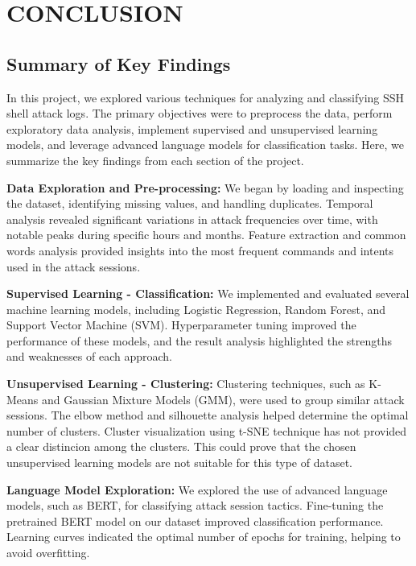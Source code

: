 

\section{CONCLUSION}


    \subsection{Summary of Key Findings}
    
        In this project, we explored various techniques for analyzing and classifying SSH shell attack logs. The primary objectives were to preprocess the data, perform exploratory data analysis, implement supervised and unsupervised learning models, and leverage advanced language models for classification tasks. Here, we summarize the key findings from each section of the project.

        \textbf{Data Exploration and Pre-processing:} We began by loading and inspecting the dataset, identifying missing values, and handling duplicates. Temporal analysis revealed significant variations in attack frequencies over time, with notable peaks during specific hours and months. Feature extraction and common words analysis provided insights into the most frequent commands and intents used in the attack sessions.

        \textbf{Supervised Learning - Classification:} We implemented and evaluated several machine learning models, including Logistic Regression, Random Forest, and Support Vector Machine (SVM). Hyperparameter tuning improved the performance of these models, and the result analysis highlighted the strengths and weaknesses of each approach.

        \textbf{Unsupervised Learning - Clustering:} Clustering techniques, such as K-Means and Gaussian Mixture Models (GMM), were used to group similar attack sessions. The elbow method and silhouette analysis helped determine the optimal number of clusters. Cluster visualization using t-SNE technique has not provided a clear distincion among the clusters. This could prove that the chosen unsupervised learning models are not suitable for this type of dataset. 

        \textbf{Language Model Exploration:} We explored the use of advanced language models, such as BERT, for classifying attack session tactics. Fine-tuning the pretrained BERT model on our dataset improved classification performance. Learning curves indicated the optimal number of epochs for training, helping to avoid overfitting. 

